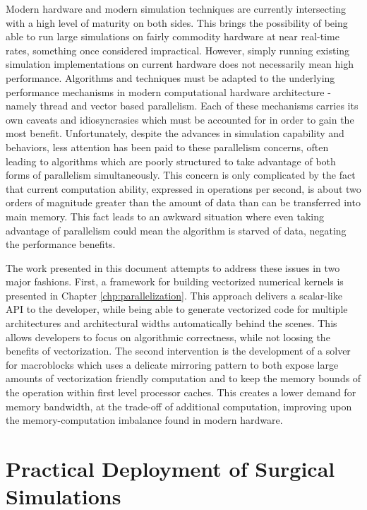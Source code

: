 Modern hardware and modern simulation techniques are currently
intersecting with a high level of maturity on both sides. This brings
the possibility of being able to run large simulations on fairly
commodity hardware at near real-time rates, something once considered
impractical. However, simply running existing simulation
implementations on current hardware does not necessarily mean high
performance. Algorithms and techniques must be adapted to the
underlying performance mechanisms in modern computational hardware
architecture - namely thread and vector based parallelism. Each of
these mechanisms carries its own caveats and idiosyncrasies which must
be accounted for in order to gain the most benefit. Unfortunately,
despite the advances in simulation capability and behaviors, less
attention has been paid to these parallelism concerns, often leading
to algorithms which are poorly structured to take advantage of both
forms of parallelism simultaneously. This concern is only complicated
by the fact that current computation ability, expressed in operations per
second, is about two orders of magnitude greater than the amount of
data than can be transferred into main memory. This fact leads to an
awkward situation where even taking advantage of parallelism could
mean the algorithm is starved of data, negating the performance benefits.

The work presented in this document attempts to address these issues
in two major fashions. First, a framework for building vectorized
numerical kernels is presented in Chapter
\ref{chp:parallelization}. This approach delivers a scalar-like API to
the developer, while being able to generate vectorized code for
multiple architectures and architectural widths automatically behind
the scenes. This allows developers to focus on algorithmic
correctness, while not loosing the benefits of vectorization. The
second intervention is the development of a solver for macroblocks
which uses a delicate mirroring pattern to both expose large amounts
of vectorization friendly computation and to keep the memory bounds of
the operation within first level processor caches. This creates a
lower demand for memory bandwidth, at the trade-off of additional
computation, improving upon the memory-computation imbalance found in
modern hardware.

\section{Practical Deployment of Surgical Simulations}

